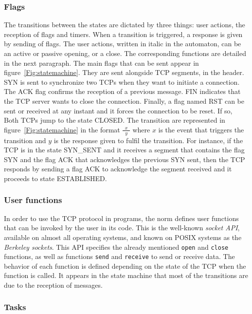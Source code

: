 \documentclass[runningheads]{llncs}
\let\state\textsf
\let\flag\textsf
\begin{document}
\subsubsection{Flags}

The transitions between the states are dictated by three things: user actions, the reception
of flags and timers. When a transition is triggered, a response is given by sending of flags.
The user actions, written in italic in the automaton, can be an active or
passive opening, or a close. The corresponding functions are detailed in the next paragraph.
The main flags that can be sent appear in figure~\ref{Fig:statemachine}. They are sent
alongside TCP segments, in the header.
\flag{SYN} is sent to synchronize two TCPs when they want to initiate a connection.
The \flag{ACK} flag confirms the reception of a previous message. \flag{FIN} indicates that
the TCP server wants to close the connection. Finally, a flag named \flag{RST} can be sent or
received at any instant and it forces the connection to be reset.
If so, Both TCPs jump to the state \state{CLOSED}.
The transition are represented in figure~\ref{Fig:statemachine} in the format
$\frac{\ \ x\ \ }{\ \ y\ \ }$ where $x$ is the event that triggers the transition and $y$ is
the response given to fulfil the transition.
For instance, if the TCP is in the state \state{SYN\_SENT} and it receives a segment that
contains the flag \flag{SYN} and the flag \flag{ACK} that acknowledges the previous \flag{SYN}
sent, then the TCP responds by sending a flag \flag{ACK} to acknowledge the segment received
and it proceeds to state \state{ESTABLISHED}.

\subsubsection{User functions}

In order to use the TCP protocol in programs, the norm defines user functions that can be invoked
by the user in its code. This is the well-known \emph{socket API}, available on almost all operating
systems, and known on POSIX systems as the \emph{Berkeley sockets}.
This API specifies the already mentioned \texttt{open} and
\texttt{close} functions, as well as functions \texttt{send} and \texttt{receive} to send
or receive data. The behavior of each function is defined depending on the state of the
TCP when the function is called.
It appears in the state machine that most of the transitions are due to the reception of
messages.

\subsubsection{Tasks}
\end{document}
